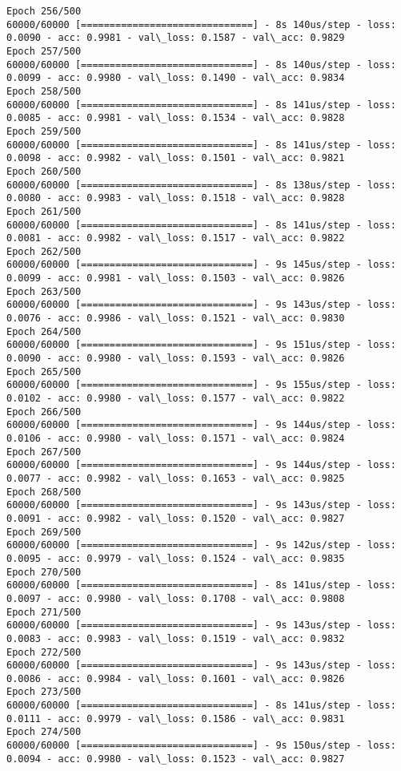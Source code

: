 \documentclass[11pt]{article}
\begin{document}
\begin{Verbatim}[commandchars=\\\{\}]
Epoch 256/500
60000/60000 [==============================] - 8s 140us/step - loss: 0.0090 - acc: 0.9981 - val\_loss: 0.1587 - val\_acc: 0.9829
Epoch 257/500
60000/60000 [==============================] - 8s 140us/step - loss: 0.0099 - acc: 0.9980 - val\_loss: 0.1490 - val\_acc: 0.9834
Epoch 258/500
60000/60000 [==============================] - 8s 141us/step - loss: 0.0085 - acc: 0.9981 - val\_loss: 0.1534 - val\_acc: 0.9828
Epoch 259/500
60000/60000 [==============================] - 8s 141us/step - loss: 0.0098 - acc: 0.9982 - val\_loss: 0.1501 - val\_acc: 0.9821
Epoch 260/500
60000/60000 [==============================] - 8s 138us/step - loss: 0.0080 - acc: 0.9983 - val\_loss: 0.1518 - val\_acc: 0.9828
Epoch 261/500
60000/60000 [==============================] - 8s 141us/step - loss: 0.0081 - acc: 0.9982 - val\_loss: 0.1517 - val\_acc: 0.9822
Epoch 262/500
60000/60000 [==============================] - 9s 145us/step - loss: 0.0099 - acc: 0.9981 - val\_loss: 0.1503 - val\_acc: 0.9826
Epoch 263/500
60000/60000 [==============================] - 9s 143us/step - loss: 0.0076 - acc: 0.9986 - val\_loss: 0.1521 - val\_acc: 0.9830
Epoch 264/500
60000/60000 [==============================] - 9s 151us/step - loss: 0.0090 - acc: 0.9980 - val\_loss: 0.1593 - val\_acc: 0.9826
Epoch 265/500
60000/60000 [==============================] - 9s 155us/step - loss: 0.0102 - acc: 0.9980 - val\_loss: 0.1577 - val\_acc: 0.9822
Epoch 266/500
60000/60000 [==============================] - 9s 144us/step - loss: 0.0106 - acc: 0.9980 - val\_loss: 0.1571 - val\_acc: 0.9824
Epoch 267/500
60000/60000 [==============================] - 9s 144us/step - loss: 0.0077 - acc: 0.9982 - val\_loss: 0.1653 - val\_acc: 0.9825
Epoch 268/500
60000/60000 [==============================] - 9s 143us/step - loss: 0.0091 - acc: 0.9982 - val\_loss: 0.1520 - val\_acc: 0.9827
Epoch 269/500
60000/60000 [==============================] - 9s 142us/step - loss: 0.0095 - acc: 0.9979 - val\_loss: 0.1524 - val\_acc: 0.9835
Epoch 270/500
60000/60000 [==============================] - 8s 141us/step - loss: 0.0097 - acc: 0.9980 - val\_loss: 0.1708 - val\_acc: 0.9808
Epoch 271/500
60000/60000 [==============================] - 9s 143us/step - loss: 0.0083 - acc: 0.9983 - val\_loss: 0.1519 - val\_acc: 0.9832
Epoch 272/500
60000/60000 [==============================] - 9s 143us/step - loss: 0.0086 - acc: 0.9984 - val\_loss: 0.1601 - val\_acc: 0.9826
Epoch 273/500
60000/60000 [==============================] - 8s 141us/step - loss: 0.0111 - acc: 0.9979 - val\_loss: 0.1586 - val\_acc: 0.9831
Epoch 274/500
60000/60000 [==============================] - 9s 150us/step - loss: 0.0094 - acc: 0.9980 - val\_loss: 0.1523 - val\_acc: 0.9827

\end{Verbatim}
\end{document}
